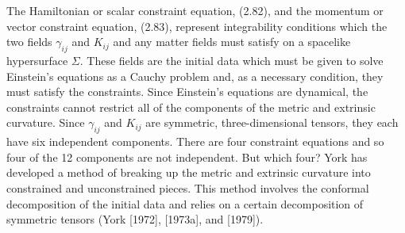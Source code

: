 The Hamiltonian or scalar constraint equation, (2.82), and the momentum or
vector constraint equation, (2.83), represent integrability conditions which the
two fields $\gamma_{ij}$ and $K_{ij}$ and any matter fields must satisfy on a
spacelike hypersurface $\Sigma$.  These fields are the initial data which must
be given to solve Einstein's equations as a Cauchy problem and, as a necessary
condition, they must satisfy the constraints.  Since Einstein's equations are
dynamical, the constraints cannot restrict all of the components of the metric
and extrinsic curvature.  Since $\gamma_{ij}$ and $K_{ij}$ are symmetric,
three-dimensional tensors, they each have six independent components.  There are
four constraint equations and so four of the 12 components are not independent. 
But which four?  York has developed a method of  breaking up the metric and
extrinsic curvature into constrained and unconstrained pieces.  This method
involves the conformal decomposition of the initial data and relies on a certain
decomposition of symmetric tensors (York [1972], [1973a], and [1979]).

